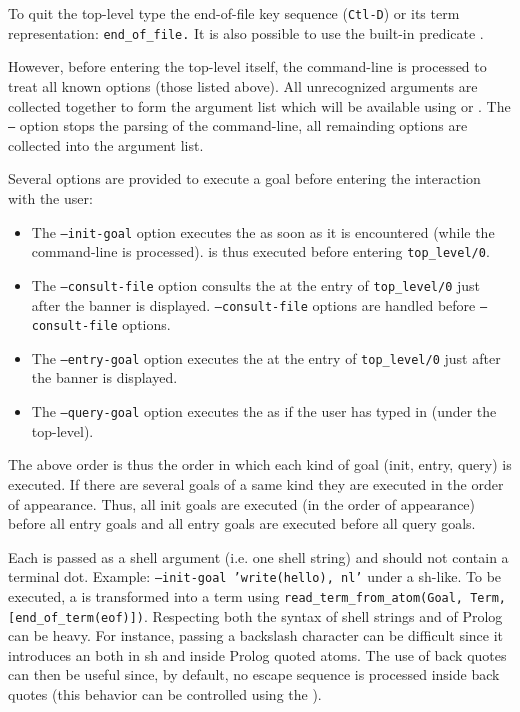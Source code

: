 To quit the top-level type the end-of-file key sequence (\texttt{Ctl-D}) or
its term representation: \texttt{end\_of\_file.} It is also possible to use
the built-in predicate  .

However, before entering the top-level itself, the command-line is processed
to treat all known options (those listed above). All unrecognized arguments
are collected together to form the argument list which will be available
using
  or
 .
The \texttt{--} option stops the parsing of the command-line, all remainding
options are collected into the argument list.

Several options are provided to execute a goal before entering the
interaction with the user:

\begin{itemize}

\item The \texttt{--init-goal} option executes the  as soon as
it is encountered (while the command-line is processed).  is thus
executed before entering \texttt{top\_level/0}.

\item The \texttt{--consult-file} option consults the  at the
entry of \texttt{top\_level/0} just after the banner is displayed. 
\texttt{--consult-file} options are handled before \texttt{--consult-file} options.

\item The \texttt{--entry-goal} option executes the  at the
entry of \texttt{top\_level/0} just after the banner is displayed.

\item The \texttt{--query-goal} option executes the  as if the
user has typed in (under the top-level).

\end{itemize}

The above order is thus the order in which each kind of goal (init, entry,
query) is executed.  If there are several goals of a same kind they are
executed in the order of appearance. Thus, all init goals are executed (in the
order of appearance) before all entry goals and all entry goals are executed
before all query goals.

Each  is passed as a shell argument (i.e. one shell string) and
should not contain a terminal dot. Example: \texttt{--init-goal
  'write(hello), nl'} under a sh-like.  To be executed, a  is
transformed into a term using
\texttt{read\_term\_from\_atom(Goal, Term,
  [end\_of\_term(eof)])}. Respecting both the syntax of shell strings and of
Prolog can be heavy. For instance, passing a backslash character
\texttt{{\bs}} can be difficult since it introduces an 
both in sh and inside Prolog quoted atoms. The use of back quotes can then be
useful since, by default, no escape sequence is processed inside back quotes
(this behavior can be controlled using the   ).


